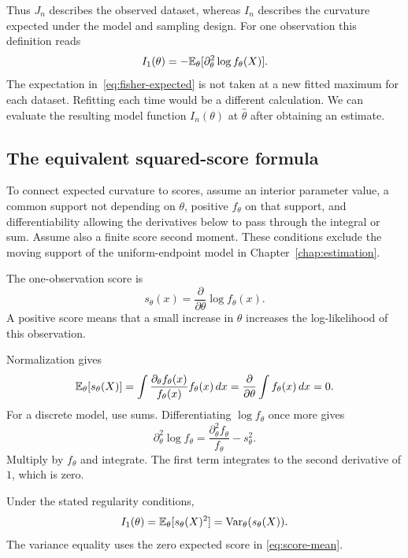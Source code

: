 Thus \(J_n\) describes the observed dataset, whereas \(I_n\) describes
the curvature expected under the model and sampling design.
For one observation this definition reads
\begin{equation}
  I_1(\theta)
     =-\mathbb{E}_\theta[\partial_\theta^2\log f_\theta(X)].
  \label{eq:fisher-curvature}
\end{equation}
The expectation in~\eqref{eq:fisher-expected} is not taken at a new
fitted maximum for each dataset. Refitting each time would be a
different calculation. We can evaluate the resulting model function
\(I_n(\theta)\) at \(\widehat\theta\) after obtaining an estimate.

\subsection{The equivalent squared-score formula}

To connect expected curvature to scores, assume an interior parameter
value, a common support not depending on \(\theta\), positive
\(f_\theta\) on that support, and differentiability allowing the
derivatives below to pass through the integral or sum. Assume also a
finite score second moment. These conditions exclude the moving
support of the uniform-endpoint model in Chapter~\ref{chap:estimation}.

\begin{definition}
The one-observation score is
\begin{equation}
  s_\theta(x)=\frac{\partial}{\partial\theta}\log f_\theta(x).
  \label{eq:score}
\end{equation}
A positive score means that a small increase in \(\theta\) increases
the log-likelihood of this observation.
\end{definition}

Normalization gives
\begin{equation}
  \mathbb{E}_\theta[s_\theta(X)]
  =\int\frac{\partial_\theta f_\theta(x)}{f_\theta(x)}
           f_\theta(x)\,dx
  =\frac{\partial}{\partial\theta}\int f_\theta(x)\,dx=0.
  \label{eq:score-mean}
\end{equation}
For a discrete model, use sums. Differentiating \(\log f_\theta\)
once more gives
\[
  \partial_\theta^2\log f_\theta
   =\frac{\partial_\theta^2 f_\theta}{f_\theta}
    -s_\theta^2.
\]
Multiply by \(f_\theta\) and integrate. The first term integrates to
the second derivative of \(1\), which is zero.

\begin{result}
Under the stated regularity conditions,
\begin{equation}
  I_1(\theta)=\mathbb{E}_\theta[s_\theta(X)^2]
            =\operatorname{Var}_\theta(s_\theta(X)).
  \label{eq:fisher}
\end{equation}
The variance equality uses the zero expected score in
\eqref{eq:score-mean}.
\end{result}

